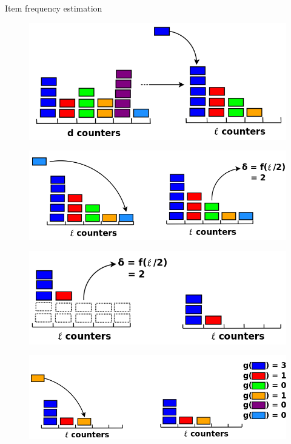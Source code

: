 \documentclass[first=dgreen,second=purple,logo=redque]{aaltoslides}
\begin{document}
\begin{frame}[allowframebreaks=1]{Item frequency estimation}
\framebreak

\begin{figure}
  \includegraphics[scale=0.35]{plots/fi2}
 \label{fig:fi2}
\end{figure}

\framebreak

\begin{figure}
  \includegraphics[scale=0.32]{plots/fi3}
 \label{fig:fi3}
\end{figure}

\framebreak

\begin{figure}
  \includegraphics[scale=0.32]{plots/fi4}
 \label{fig:fi4}
\end{figure}

\framebreak

\begin{figure}
  \includegraphics[scale=0.3]{plots/fi5}
 \label{fig:fi5}
\end{figure}


\end{frame}
\end{document}
